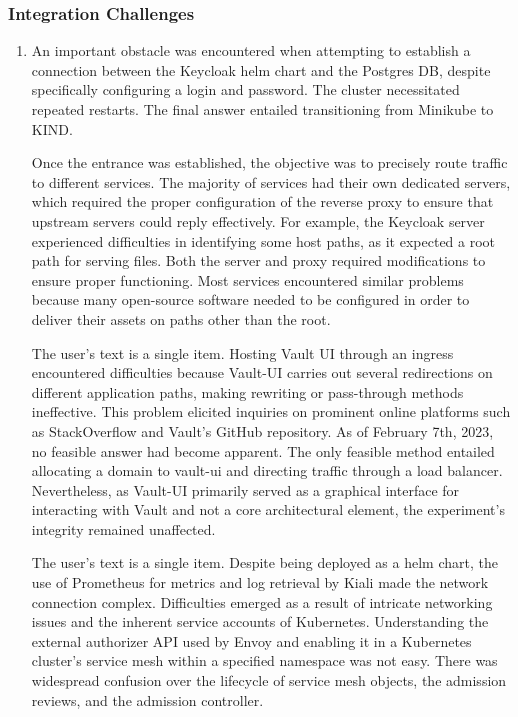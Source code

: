 \documentclass[review]{elsarticle}
\begin{document}
\subsubsection{Integration Challenges} 

\begin{enumerate} [label=({\alph*}) , leftmargin=30px]

  \item An important obstacle was encountered when attempting to establish a connection between the Keycloak helm chart and the Postgres DB, despite specifically configuring a login and password. The cluster necessitated repeated restarts. The final answer entailed transitioning from Minikube to KIND.

     Once the entrance was established, the objective was to precisely route traffic to different services. The majority of services had their own dedicated servers, which required the proper configuration of the reverse proxy to ensure that upstream servers could reply effectively. For example, the Keycloak server experienced difficulties in identifying some host paths, as it expected a root path for serving files. Both the server and proxy required modifications to ensure proper functioning. Most services encountered similar problems because many open-source software needed to be configured in order to deliver their assets on paths other than the root.

    The user's text is a single item. Hosting Vault UI through an ingress encountered difficulties because Vault-UI carries out several redirections on different application paths, making rewriting or pass-through methods ineffective. This problem elicited inquiries on prominent online platforms such as StackOverflow and Vault's GitHub repository. As of February 7th, 2023, no feasible answer had become apparent. The only feasible method entailed allocating a domain to vault-ui and directing traffic through a load balancer. Nevertheless, as Vault-UI primarily served as a graphical interface for interacting with Vault and not a core architectural element, the experiment's integrity remained unaffected.

    The user's text is a single item. Despite being deployed as a helm chart, the use of Prometheus for metrics and log retrieval by Kiali made the network connection complex. Difficulties emerged as a result of intricate networking issues and the inherent service accounts of Kubernetes. Understanding the external authorizer API used by Envoy and enabling it in a Kubernetes cluster's service mesh within a specified namespace was not easy. There was widespread confusion over the lifecycle of service mesh objects, the admission reviews, and the admission controller.

\end{enumerate}
\end{document}
